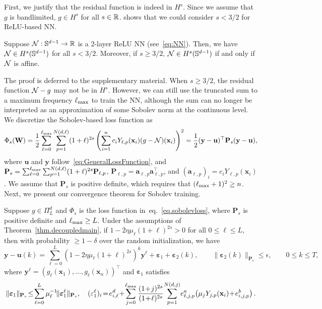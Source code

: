 \documentclass{article} %
\begin{document}
First, we justify that the residual function is indeed in $H^s$. Since we assume that $g$ is bandlimited, $g \in H^s$ for all $s \in \mathbb{R}$.  shows that we could consider $s < 3/2$ for ReLU-based NN.
\begin{prop}\label{prop.sobolev}
Suppose ${\mathcal{N}}: {\mathbb{S}}^{d-1} \rightarrow \mathbb{R}$ is a 2-layer ReLU NN (see~\cref{eq:NN}). Then, we have ${\mathcal{N}} \in H^s({\mathbb{S}}^{d-1})$ for all $s < 3/2$. Moreover, if $s \geq 3/2$, ${\mathcal{N}} \in H^s({\mathbb{S}}^{d-1})$ if and only if ${\mathcal{N}}$ is affine.
\end{prop}

The proof is deferred to the supplementary material. When $s \geq 3/2$, the residual function ${\mathcal{N}}-g$ may not be in $H^s$. However, we can still use the truncated sum to a maximum frequency $\ell_{\text{max}}$ to train the NN, although the sum can no longer be interpreted as an approximation of some Sobolev norm at the continuous level. We discretize the Sobolev-based loss function as
\begin{equation}\label{eq.sobolevloss}
    \Phi_s(\mathbf{W}) = \frac{1}{2} \sum_{\ell = 0}^{\ell_{\text{max}}} \sum_{p=1}^{N(d,\ell)} (1+\ell)^{2s} \left(\sum_{i=1}^n c_i Y_{\ell,p}(\mathbf{x}_i) (g-{\mathcal{N}})(\mathbf{x}_i)\right)^2 = 
   \frac{1}{2} (\mathbf{y} - \mathbf{u})^\top \mathbf{P}_s (\mathbf{y} - \mathbf{u}),
\end{equation}
where $\mathbf{u}$ and $\mathbf{y}$ follow~\cref{eq:GeneralLossFunction}, and $\mathbf{P}_s = \sum_{\ell=0}^{\ell_{\text{max}}} \sum_{p=1}^{N(d,\ell)} (1+\ell)^{2s} \mathbf{P}_{\ell,p}$, $\mathbf{P}_{\ell,p} = \mathbf{a}_{\ell,p} \mathbf{a}_{\ell,p}^\top$, and $(\mathbf{a}_{\ell,p})_i = c_i Y_{\ell,p}(\mathbf{x}_i)$. We assume that $\mathbf{P}_s$ is positive definite, which requires that $(\ell_{\text{max}}+1)^2 \geq n$. Next, we present our convergence theorem for Sobolev training.
\begin{thm}\label{thm.sobconvergence}
Suppose $g \in \Pi_L^d$ and $\Phi_s$ is the loss function in~eq.~\eqref{eq.sobolevloss}, where $\mathbf{P}_s$ is positive definite and $\ell_{\text{max}} \geq L$. Under the assumptions of Theorem~\ref{thm.decoupledmain}, if $1 - 2\eta\mu_\ell (1+\ell)^{2s} > 0$ for all $0 \leq \ell \leq L$, then with probability $\geq 1-\delta$ over the random initialization, we have
\[
    \mathbf{y} - \mathbf{u}(k) = \sum_{\ell=0}^L \left(1-2\eta\mu_\ell(1+\ell)^{2s}\right)^k \mathbf{y}^\ell + \boldsymbol{\varepsilon}_1 + \boldsymbol{\varepsilon}_2(k), \qquad \|\boldsymbol{\varepsilon}_2(k)\|_{\mathbf{P}_s} \leq \epsilon, \qquad 0\leq k\leq T,
\]
where $\mathbf{y}^\ell = (g_\ell(\mathbf{x}_1), \ldots, g_\ell(\mathbf{x}_n))^\top$ and $\boldsymbol{\varepsilon}_1$ satisfies
\begin{align*}
   \|\boldsymbol{\varepsilon}_1\|_{\mathbf{P}_s} \!\leq\! \sum_{\ell = 0}^L \mu_\ell^{-1} \! \|\boldsymbol{\varepsilon}_1^\ell\|_{\mathbf{P}_s}, \quad (\varepsilon_1^\ell)_i \!=\! e_{i,\ell}^d \!+\! \sum_{j = 0}^{\lmax} \frac{(1\!+\!j)^{2s}}{(1\!+\!\ell)^{2s}}\!\sum_{p=1}^{N(d,j)}\! e^a_{\ell,j,p}\! \left(\mu_j Y_{j,p}(\mathbf{x}_i) \!+\! e_{i,j,p}^b\right).
\end{align*}
\end{thm}
\end{document}
